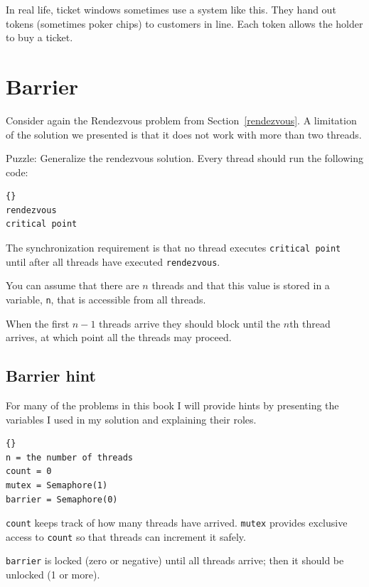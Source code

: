 \documentclass{book}
\begin{document}
In real life, ticket windows sometimes use a system like
this.  They hand out tokens (sometimes poker chips) to
customers in line.  Each token allows the holder to buy a ticket.




\section{Barrier}

Consider again the Rendezvous problem from Section~\ref{rendezvous}.
A limitation of the solution we presented is that it does
not work with more than two threads.

Puzzle: Generalize the rendezvous solution.  Every thread should
run the following code:
\begin{lstlisting}[title={Barrier code}]{}
rendezvous
critical point
\end{lstlisting}

The synchronization requirement is that
no thread executes {\tt critical point} until after all
threads have executed {\tt rendezvous}.

You can assume that there are $n$
threads and that this value is stored in a variable, {\tt n},
that is accessible from all threads.

When the first $n-1$ threads arrive they should block until the $n$th
thread arrives, at which point all the threads may proceed.



\subsection {Barrier hint}

For many of the problems in this book I will provide hints
by presenting the variables I used in my solution and
explaining their roles.

\begin{lstlisting}[title={Barrier hint}]{}
n = the number of threads
count = 0
mutex = Semaphore(1)
barrier = Semaphore(0)
\end{lstlisting}

{\tt count} keeps track of how many threads have arrived.
    {\tt mutex} provides exclusive access to {\tt count} so that
threads can increment it safely.

    {\tt barrier} is locked
(zero or negative) until all threads arrive; then it should
be unlocked (1 or more).
\end{document}
